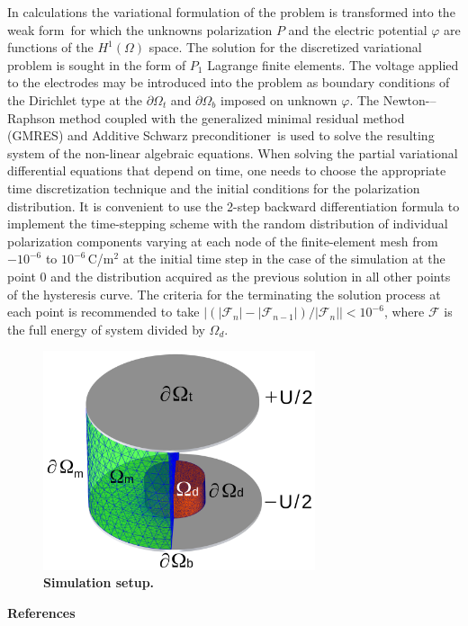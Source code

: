 \documentclass[%
preprint,
amsmath,amssymb,
aps
]{revtex4-2}
\begin{document}
In calculations the variational formulation of the problem is transformed into the weak form\,\cite{Brenner2008} for which the unknowns polarization $P$ and the electric potential $\varphi$ are functions of the $\mathit{H^1}(\Omega)$ space. The solution for the discretized variational problem is sought in the form of $P_1$ Lagrange finite elements. The voltage applied to the electrodes may be introduced into the problem as boundary conditions of the Dirichlet type at the $\partial\Omega_{t}$ and $\partial\Omega_{b}$ imposed on unknown $\varphi$. The Newton-–Raphson method 
coupled with the generalized minimal residual method (GMRES) and Additive Schwarz preconditioner\,\cite{petsc-web-page, petsc-user-ref}  is used to solve the resulting system of the non-linear algebraic equations. When solving the partial variational differential equations that depend on time, one needs to choose the appropriate time discretization technique and the initial conditions for the polarization distribution. It is convenient to use the 2-step backward differentiation formula to implement the time-stepping scheme with the random distribution of individual polarization components varying at each node of the finite-element mesh from $-10^{-6}$ to $10^{-6}$\,C/m$^2$ at the initial time step in the case of the simulation at the point $0$ and the distribution acquired as the previous solution in all other points of the hysteresis curve. The criteria for the terminating the solution process at each point is recommended to take $|(|\mathcal{F}_n| - |\mathcal{F}_{n-1}|)/|\mathcal{F}_n|| < 10^{-6}$, where $\mathcal{F}$ is the full energy of system divided by $\Omega_d$.

\begin{figure}[t!!]
\center
\includegraphics [width=8cm] {FigSI.png}
\caption{ \textbf{Simulation setup.}
}
\label{FigSiSetup} 
\end{figure}

\bigskip

\noindent \textbf{References}
\vspace{-0.3cm}


\end{document}
